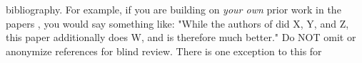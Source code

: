 \documentclass{sig-alternate}
\begin{document}
%
%
%

bibliography.  For example, if you are building on {\em your own} prior
work in the papers \cite{nicepaper1,nicepaper2,nicepaper3}, you would say
something like: "While the authors of
\cite{nicepaper1,nicepaper2,nicepaper3} did X, Y, and Z, this paper
additionally does W, and is therefore much better."  Do NOT omit or
anonymize references for blind review.  There is one exception to this for

%
\end{document}
